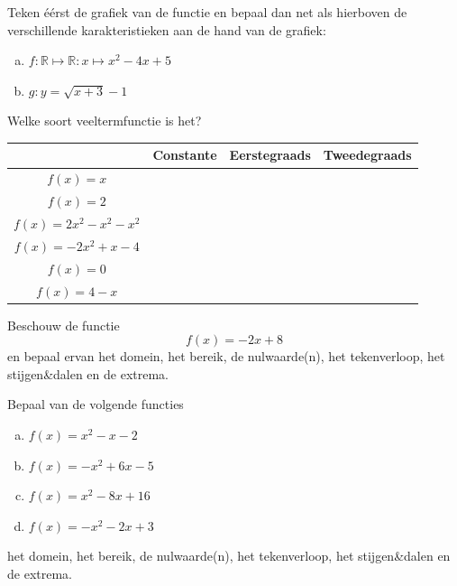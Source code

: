 \documentclass[12pt,twoside]{article}
\begin{document}
\begin{oefening}
Teken éérst de grafiek van de functie en bepaal dan net als hierboven de verschillende karakteristieken aan de hand van de grafiek:
\begin{enumerate}[(a)]
  \item $f:\mathbb{R}\mapsto\mathbb{R}: x\mapsto x^2 -4x + 5$
  \item $g: y=\sqrt{x+3}-1$
\end{enumerate}
\end{oefening}

\begin{oefening}
Welke soort veeltermfunctie is het?
\begin{center}
\begin{tabular}{c|c|c|c}
        & Constante & Eerstegraads & Tweedegraads\\
\hline
$\displaystyle f(x)=x$ &&&\\
$\displaystyle f(x)=2$ &&&\\
$\displaystyle f(x)=2x^2-x^2-x^2$ &&&\\
$\displaystyle f(x)=-2x^2+x-4$ &&&\\
$\displaystyle f(x)=0$ &&&\\
$\displaystyle f(x)=4-x$ &&&\\
\end{tabular}
\end{center}
\end{oefening}

\begin{oefening}
Beschouw de functie
$$f(x)=-2x+8$$
en bepaal ervan het domein, het bereik, de nulwaarde(n), het tekenverloop, het stijgen\&dalen en de extrema.
\end{oefening}

\begin{oefening}
Bepaal van de volgende functies
\begin{enumerate}[(a)]
  \item $\displaystyle f(x)=x^2-x-2$
  \item $\displaystyle f(x)=-x^2+6x-5$
  \item $\displaystyle f(x)=x^2-8x+16$
  \item $\displaystyle f(x)=-x^2-2x+3$
\end{enumerate}
het domein, het bereik, de nulwaarde(n), het tekenverloop, het stijgen\&dalen en de extrema.
\end{oefening}
\end{document}
